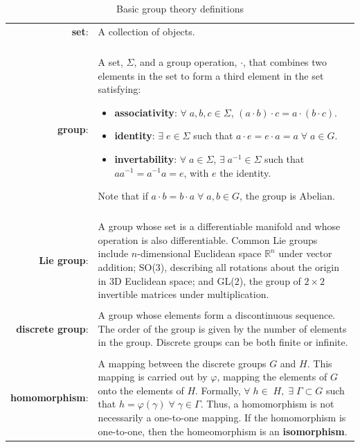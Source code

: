 \begin{table}[t]
  \centering
\caption{Basic group theory definitions}
\begin{tabular}{|r l|}
\hline
{\bf set}:& A collection of objects.\\ \\
{\bf group}:& \begin{minipage}[t]{0.65\textwidth}
A set, $\Sigma$, and a group operation, $\cdot$, that combines two elements in the set to form a third element in the set satisfying:
    \begin{itemize}
      \item[]{\bf associativity}: $\forall \; a,b,c \in \Sigma$, $(a \cdot b) \cdot c = a \cdot (b \cdot c)$.
      \item[]{\bf identity}: $\exists \; e \in \Sigma$ such that $a\cdot e=e \cdot a = a \; \forall \; a \in G$.
      \item[]{\bf invertability}: $\forall \; a \in \Sigma$, $\exists \; a^{-1} \in \Sigma$ such that $a a^{-1} = a^{-1} a = e$, with $e$ the identity.
    \end{itemize}
    Note that if $a \cdot b = b \cdot a \; \forall \; a,b \in G$, the group is Abelian.
\end{minipage}\\ \\
{\bf Lie group}:& \begin{minipage}[t]{0.65\textwidth}
A group whose set is a differentiable manifold and whose operation is also differentiable. Common Lie groups include $n$-dimensional Euclidean space $\mathbb{R}^n$ under vector addition; SO(3), describing all rotations about the origin in 3D Euclidean space; and GL(2), the group of $2 \times 2$ invertible matrices under multiplication.
\end{minipage}\\ \\
{\bf discrete group}:& \begin{minipage}[t]{0.65\textwidth}
A group whose elements form a discontinuous sequence. The order of the group is given by the number of elements in the group. Discrete groups can be both finite or infinite.
\end{minipage}\\ \\
{\bf homomorphism}:& \begin{minipage}[t]{0.65\textwidth}
A mapping between the discrete groups $G$ and $H$. This mapping is carried out by $\varphi$, mapping the elements of $G$ onto the elements of $H$. Formally, $\forall \; h \in \; H, \; \exists \; \Gamma \subset G$ such that $h = \varphi(\gamma) \; \forall \; \gamma \in \Gamma$. Thus, a homomorphism is not necessarily a one-to-one mapping. If the homomorphism is one-to-one, then the homeomorphism is an {\bf isomorphism}.
\end{minipage}\\
\hline
\end{tabular}
\label{t:2-GroupTheory}
\end{table}
